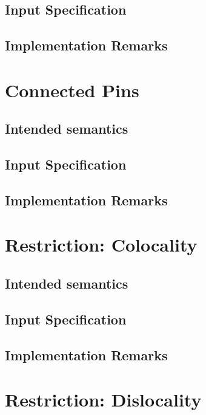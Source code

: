 \subsection{Input Specification}

\subsection{Implementation Remarks}

\section{Connected Pins}
\label{sec:connected-pins}

\subsection{Intended semantics}

\subsection{Input Specification}

\subsection{Implementation Remarks}

\section{Restriction: Colocality}
\label{sec:restr-colocality}

\subsection{Intended semantics}

\subsection{Input Specification}

\subsection{Implementation Remarks}

\section{Restriction: Dislocality}
\label{sec:restr-dislocality}

